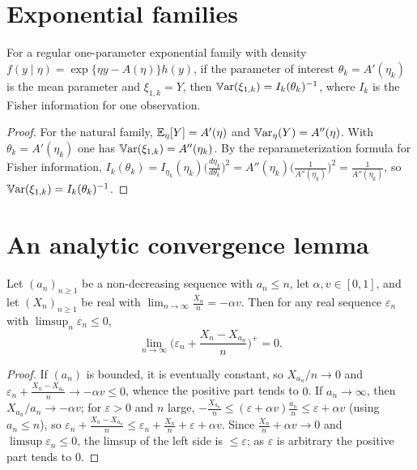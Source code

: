 \section{Exponential families}
\label{sec:tech_expfam}

\begin{proposition}\label{prop:exp_fam}
For a regular one-parameter exponential family with density
$f(y\mid\eta) = \exp\{\eta y - A(\eta)\}h(y)$, if the parameter of interest
$\theta_k = A'(\eta_k)$ is the mean parameter and $\xi_{1,k} = Y$, then
$\mathbb{V}\mathrm{ar}(\xi_{1,k}) = I_k(\theta_k)^{-1}$, where $I_k$ is the Fisher information for
one observation.
\end{proposition}

\begin{proof}
For the natural family, $\mathbb{E}_\eta[Y] = A'(\eta)$ and $\mathbb{V}\mathrm{ar}_\eta(Y) = A''(\eta)$.
With $\theta_k = A'(\eta_k)$ one has $\mathbb{V}\mathrm{ar}(\xi_{1,k}) = A''(\eta_k)$. By the
reparameterization formula for Fisher information,
$I_k(\theta_k) = I_{\eta_k}(\eta_k)\big(\frac{d\eta_k}{d\theta_k}\big)^2
 = A''(\eta_k)\big(\frac{1}{A''(\eta_k)}\big)^2 = \frac{1}{A''(\eta_k)}$,
so $\mathbb{V}\mathrm{ar}(\xi_{1,k}) = I_k(\theta_k)^{-1}$.
\end{proof}

\section{An analytic convergence lemma}
\label{sec:tech_analytic}

\begin{lemma}\label{lem:convergence}
\leanok
Let $(a_n)_{n\ge1}$ be a non-decreasing sequence with $a_n \le n$, let
$\alpha, v \in [0,1]$, and let $(X_n)_{n\ge1}$ be real with
$\lim_{n\to\infty} \frac{X_n}{n} = -\alpha v$. Then for any real sequence
$\varepsilon_n$ with $\limsup_n \varepsilon_n \le 0$,
\[
  \lim_{n\to\infty}\Big(\varepsilon_n + \frac{X_n - X_{a_n}}{n}\Big)^+ = 0.
\]
\end{lemma}

\begin{proof}\leanok
If $(a_n)$ is bounded, it is eventually constant, so $X_{a_n}/n \to 0$ and
$\varepsilon_n + \frac{X_n - X_{a_n}}{n} \to -\alpha v \le 0$, whence the positive
part tends to $0$. If $a_n \to \infty$, then $X_{a_n}/a_n \to -\alpha v$; for
$\varepsilon>0$ and $n$ large, $-\frac{X_{a_n}}{n} \le (\varepsilon + \alpha v)\frac{a_n}{n}
 \le \varepsilon + \alpha v$ (using $a_n \le n$), so
$\varepsilon_n + \frac{X_n - X_{a_n}}{n} \le \varepsilon_n + \frac{X_n}{n} + \varepsilon + \alpha v$.
Since $\frac{X_n}{n} + \alpha v \to 0$ and $\limsup \varepsilon_n \le 0$, the
limsup of the left side is $\le \varepsilon$; as $\varepsilon$ is arbitrary the
positive part tends to $0$.
\end{proof}

